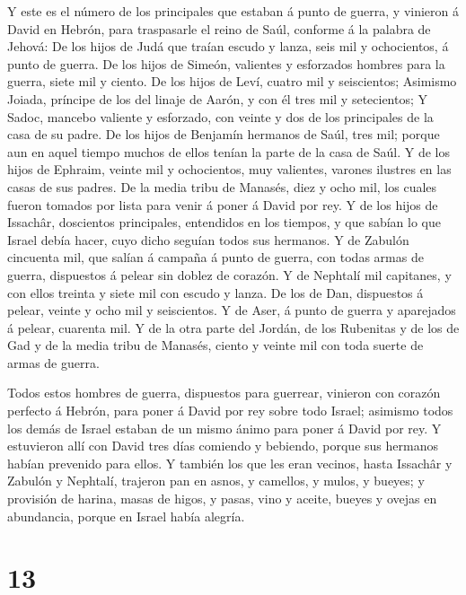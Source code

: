  Y este es el número de los principales que estaban á punto
de guerra, y vinieron á David en Hebrón, para traspasarle el reino de
Saúl, conforme á la palabra de Jehová:  De los hijos de
Judá que traían escudo y lanza, seis mil y ochocientos, á punto de
guerra.  De los hijos de Simeón, valientes y esforzados
hombres para la guerra, siete mil y ciento.  De los hijos
de Leví, cuatro mil y seiscientos;  Asimismo Joiada,
príncipe de los del linaje de Aarón, y con él tres mil y setecientos;
 Y Sadoc, mancebo valiente y esforzado, con veinte y dos de
los principales de la casa de su padre.  De los hijos de
Benjamín hermanos de Saúl, tres mil; porque aun en aquel tiempo muchos
de ellos tenían la parte de la casa de Saúl.  Y de los
hijos de Ephraim, veinte mil y ochocientos, muy valientes, varones
ilustres en las casas de sus padres.  De la media tribu de
Manasés, diez y ocho mil, los cuales fueron tomados por lista para venir
á poner á David por rey.  Y de los hijos de Issachâr,
doscientos principales, entendidos en los tiempos, y que sabían lo que
Israel debía hacer, cuyo dicho seguían todos sus hermanos. 
Y de Zabulón cincuenta mil, que salían á campaña á punto de guerra, con
todas armas de guerra, dispuestos á pelear sin doblez de corazón.
 Y de Nephtalí mil capitanes, y con ellos treinta y siete
mil con escudo y lanza.  De los de Dan, dispuestos á
pelear, veinte y ocho mil y seiscientos.  Y de Aser, á
punto de guerra y aparejados á pelear, cuarenta mil.  Y de
la otra parte del Jordán, de los Rubenitas y de los de Gad y de la media
tribu de Manasés, ciento y veinte mil con toda suerte de armas de
guerra.

 Todos estos hombres de guerra, dispuestos para guerrear,
vinieron con corazón perfecto á Hebrón, para poner á David por rey sobre
todo Israel; asimismo todos los demás de Israel estaban de un mismo
ánimo para poner á David por rey.  Y estuvieron allí con
David tres días comiendo y bebiendo, porque sus hermanos habían
prevenido para ellos.  Y también los que les eran vecinos,
hasta Issachâr y Zabulón y Nephtalí, trajeron pan en asnos, y camellos,
y mulos, y bueyes; y provisión de harina, masas de higos, y pasas, vino
y aceite, bueyes y ovejas en abundancia, porque en Israel había alegría.

\hypertarget{section-12}{%
\section{13}\label{section-12}}

